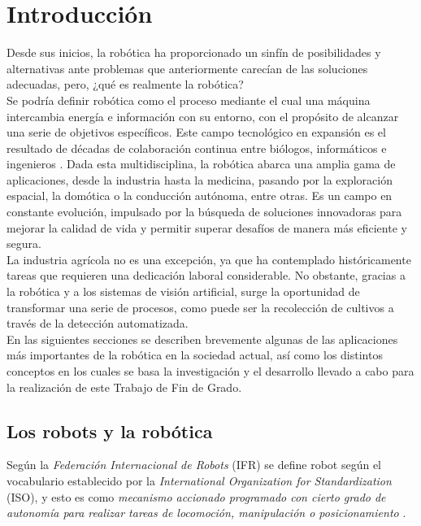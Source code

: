 \chapter{Introducción}
\label{cap:capitulo1}
\setcounter{page}{1}

Desde sus inicios, la robótica ha proporcionado un sinfín de posibilidades y alternativas ante problemas que anteriormente carecían de las soluciones adecuadas, pero, ¿qué es realmente la robótica?\\

Se podría definir robótica como el proceso mediante el cual una máquina intercambia energía e información con su entorno, con el propósito de alcanzar una serie de objetivos específicos. Este campo tecnológico en expansión es el resultado de décadas de colaboración continua entre biólogos, informáticos e ingenieros \cite{Koditschek21}. Dada esta multidisciplina, la robótica abarca una amplia gama de aplicaciones, desde la industria hasta la medicina, pasando por la exploración espacial, la domótica o la conducción autónoma, entre otras. Es un campo en constante evolución, impulsado por la búsqueda de soluciones innovadoras para mejorar la calidad de vida y permitir superar desafíos de manera más eficiente y segura.\\

La industria agrícola no es una excepción, ya que ha contemplado históricamente tareas que requieren una dedicación laboral considerable. No obstante, gracias a la robótica y a los sistemas de visión artificial, surge la oportunidad de transformar una serie de procesos, como puede ser la recolección de cultivos a través de la detección automatizada.\\

En las siguientes secciones se describen brevemente algunas de las aplicaciones más importantes de la robótica en la sociedad actual, así como los distintos conceptos en los cuales se basa la investigación y el desarrollo llevado a cabo para la realización de este Trabajo de Fin de Grado.\\

\section{Los robots y la robótica}
\label{sec:robótica} %

Según la \textit{Federación Internacional de Robots} (IFR) se define robot según el vocabulario establecido por la \textit{International Organization for Standardization} (ISO), y esto es como \textit{mecanismo accionado programado con cierto grado de autonomía para realizar tareas de locomoción, manipulación o posicionamiento} \cite{ISO8373}.\\  

